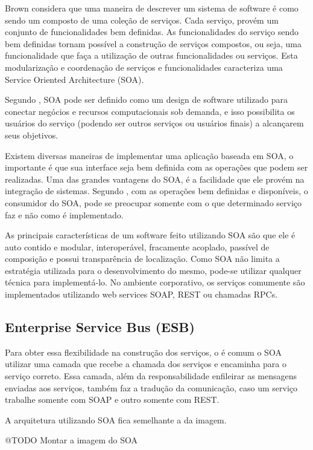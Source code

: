 Brown considera que uma maneira de descrever um sistema de software é como sendo um composto de 
uma coleção de serviços. Cada serviço, provém um conjunto de funcionalidades bem definidas. 
As funcionalidades do serviço sendo bem definidas tornam possível a construção de serviços 
compostos, ou seja, uma funcionalidade que faça a utilização de outras funcionalidades ou serviços. 
Esta modularização e coordenação de serviços e funcionalidades caracteriza uma 
Service Oriented Architecture (SOA).

Segundo \cite{valipour}, SOA pode ser definido como um design de software utilizado para 
conectar negócios e recursos computacionais sob demanda, e isso possibilita os usuários 
do serviço (podendo ser outros serviços ou usuários finais) a alcançarem seus objetivos. 

Existem diversas maneiras de implementar uma aplicação baseada em SOA, o importante é que 
sua interface seja bem definida com as operações que podem ser realizadas. 
Uma das grandes vantagens do SOA, é a facilidade que ele provém na integração de sistemas. 
Segundo \cite{valipour}, com as operações bem definidas e disponíveis, o consumidor do SOA, 
pode se preocupar somente com o que determinado serviço faz e não como é implementado.

As principais características de um software feito utilizando SOA são que ele é auto contido e 
modular, interoperável, fracamente acoplado, passível de composição e possui transparência de localização. 
Como SOA não limita a estratégia utilizada para o desenvolvimento do mesmo, pode-se utilizar qualquer 
técnica para implementá-lo. No ambiente corporativo, os serviços comumente são implementados 
utilizando web services SOAP, REST ou chamadas RPCs.

\subsection{Enterprise Service Bus (ESB)}

Para obter essa flexibilidade na construção dos serviços, o é comum o SOA utilizar
uma camada que recebe a chamada dos serviços e encaminha para o serviço correto.
Essa camada, além da responsabilidade enfileirar as mensagens enviadas aos serviços,
também faz a tradução da comunicação, caso um serviço trabalhe somente com SOAP e outro somente
com REST.

A arquitetura utilizando SOA fica semelhante a da imagem.

@TODO Montar a imagem do SOA

